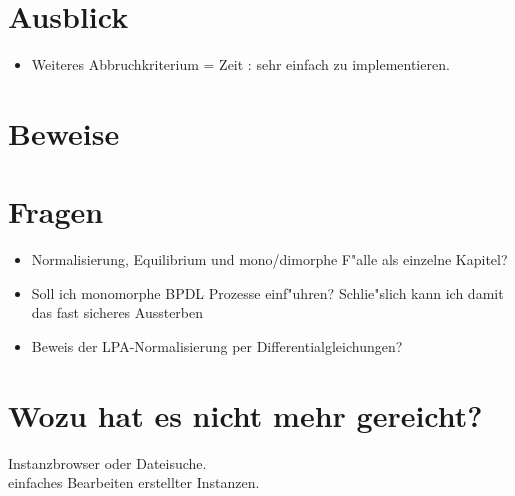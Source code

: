 \documentclass[11pt, a4paper, german]{article}
\begin{document}
\section{Ausblick}

\begin{itemize}
	\item Weiteres Abbruchkriterium = Zeit : sehr einfach zu implementieren.
\end{itemize}

\clearpage


\clearpage

\section{Beweise}


\section{Fragen}
\begin{itemize}
	\item Normalisierung, Equilibrium und mono/dimorphe F"alle als einzelne Kapitel?
	\item Soll ich monomorphe BPDL Prozesse einf"uhren? Schlie"slich kann ich damit das fast sicheres Aussterben 
	\item Beweis der LPA-Normalisierung per Differentialgleichungen?
\end{itemize}

\section{Wozu hat es nicht mehr gereicht?}
Instanzbrowser oder Dateisuche.\\
einfaches Bearbeiten erstellter Instanzen.\\
\end{document}
